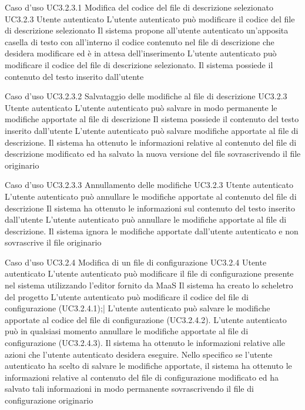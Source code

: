\UCtitle
{Caso d'uso UC3.2.3.1}
{Modifica del codice del file di descrizione selezionato}
\UC
{UC3.2.3}
{Utente autenticato}
{L'utente autenticato può modificare il codice del file di descrizione selezionato}
{Il sistema propone all'utente autenticato un'apposita casella di testo con all'interno il codice contenuto nel file di descrizione che desidera modificare ed è in attesa dell'inserimento}
\scenario
{L'utente autenticato può modificare il codice del file di descrizione selezionato.}
\post
{Il sistema possiede il contenuto del testo inserito dall'utente}

\UCtitle
{Caso d'uso UC3.2.3.2}
{Salvataggio delle modifiche al file di descrizione}
\UC
{UC3.2.3}
{Utente autenticato}
{L'utente autenticato può salvare in modo permanente le modifiche apportate al file di descrizione}
{Il sistema possiede il contenuto del testo inserito dall'utente}
\scenario
{L'utente autenticato può salvare modifiche apportate al file di descrizione.}
\post
{Il sistema ha ottenuto le informazioni relative al contenuto del file di descrizione modificato ed ha salvato la nuova versione del file sovrascrivendo il file originario}

\UCtitle
{Caso d'uso UC3.2.3.3}
{Annullamento delle modifiche}
\UC
{UC3.2.3}
{Utente autenticato}
{L'utente autenticato può annullare le modifiche apportate al contenuto del file di descrizione}
{Il sistema ha ottenuto le informazioni sul contenuto del testo inserito dall'utente}
\scenario
{L'utente autenticato può annullare le modifiche apportate al file di descrizione.}
\post
{Il sistema ignora le modifiche apportate dall'utente autenticato e non sovrascrive il file originario}


\UCtitle
{Caso d'uso UC3.2.4}
{Modifica di un file di configurazione}
\UC
{UC3.2.4}
{Utente autenticato}
{L'utente autenticato può modificare il file di configurazione presente nel sistema utilizzando l'editor fornito da MaaS}
{Il sistema ha creato lo scheletro del progetto}
\scenario
{L'utente autenticato può modificare il codice del file di configurazione (UC3.2.4.1);|
L'utente autenticato può salvare le modifiche apportate al codice del file di configurazione (UC3.2.4.2).
}
\estensioni
{L'utente autenticato può in qualsiasi momento annullare le modifiche apportate al file di configurazione (UC3.2.4.3).}
\post
{Il sistema ha ottenuto le informazioni relative alle azioni che l'utente autenticato desidera eseguire. Nello specifico se l'utente autenticato ha scelto di salvare le modifiche apportate, il sistema ha ottenuto le informazioni relative al contenuto del file di configurazione modificato ed ha salvato tali informazioni in modo permanente sovrascrivendo il file di configurazione originario}

